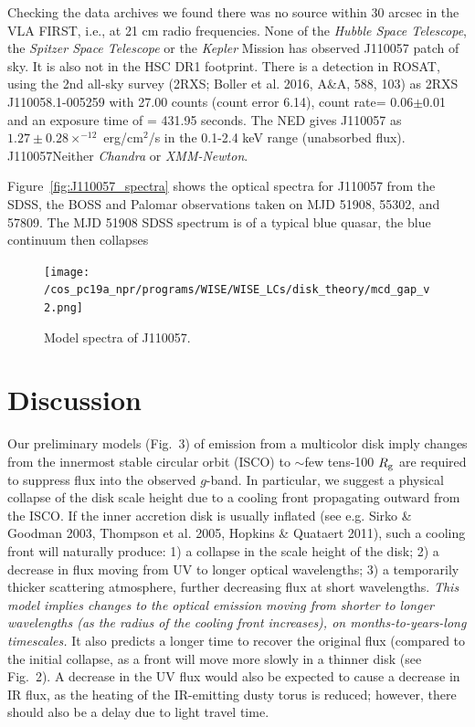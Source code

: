 \documentclass{nature}
\begin{document}
Checking the data archives we found there was 
no source within 30 arcsec in the VLA FIRST, i.e., at 21 cm radio frequencies.
None of the {\it Hubble Space Telescope}, the {\it Spitzer Space
Telescope} or the {\it Kepler} Mission has observed J110057 patch of
sky. It is also not in the HSC DR1 footprint.  There is a detection in
ROSAT, using the 2nd all-sky survey (2RXS; Boller et al. 2016, A\&A,
588, 103) as 2RXS J110058.1-005259 with 27.00 counts (count error
6.14), count rate= 0.06$\pm$0.01 and an exposure time of = 431.95
seconds.  The NED gives J110057 as $1.27\pm0.28 \times^{-12}$
erg/cm$^{2}$/s in the 0.1-2.4 keV range (unabsorbed
flux). J110057Neither {\it Chandra} or {\it XMM-Newton}.

Figure~\ref{fig:J110057_spectra} shows the optical spectra for J110057
from the SDSS, the BOSS and Palomar observations taken on MJD 51908,
55302, and 57809. The MJD 51908 SDSS spectrum is of a typical blue quasar, 
the blue continuum then collapses 


\begin{figure}
  \texttt{[image: /cos\_pc19a\_npr/programs/WISE/WISE\_LCs/disk\_theory/mcd\_gap\_v2.png]}
  \centering
  \caption[]{Model spectra of J110057. }
  \label{fig:J110057_diskmodel}
\end{figure}
\section{Discussion}   %
Our preliminary models (Fig.~3) of emission from a multicolor disk
imply changes from the innermost stable circular orbit (ISCO) to
$\sim$few tens-100 $R_{\rm g}$ are required to suppress flux into the
observed $g$-band. In particular, we suggest a physical collapse of
the disk scale height due to a cooling front propagating outward from
the ISCO. If the inner accretion disk is usually inflated (see
e.g. Sirko \& Goodman 2003, Thompson et al. 2005, Hopkins \& Quataert
2011), such a cooling front will naturally produce: 1) a collapse in
the scale height of the disk; 2) a decrease in flux moving from UV to
longer optical wavelengths; 3) a temporarily thicker scattering
atmosphere, further decreasing flux at short wavelengths. {\it This
model implies changes to the optical emission moving from shorter to
longer wavelengths (as the radius of the cooling front increases), on
months-to-years-long timescales.} It also predicts a longer time to
recover the original flux (compared to the initial collapse, as a
front will move more slowly in a thinner disk (see Fig.~2). A decrease
in the UV flux would also be expected to cause a decrease in IR flux,
as the heating of the IR-emitting dusty torus is reduced; however,
there should also be a delay due to light travel time.
\end{document}
